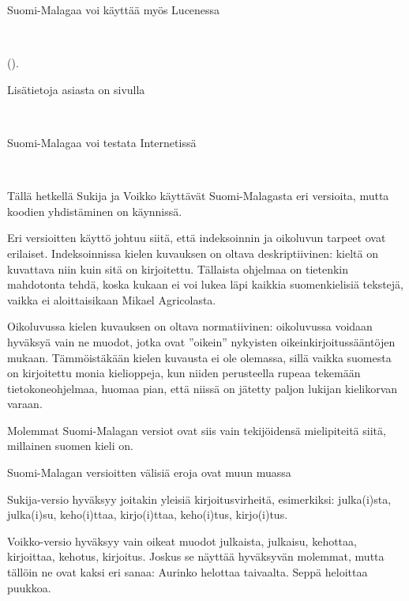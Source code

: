 \documentclass[12pt]{article}
\begin{document}
Suomi-Malagaa voi käyttää myös Lucenessa
\begin{latexonly} \\ \end{latexonly}
().

Lisätietoja asiasta on sivulla
\begin{latexonly} \\ \end{latexonly}

Suomi-Malagaa voi testata Internetissä
\begin{latexonly} \\ \end{latexonly}

\bigskip

Tällä hetkellä Sukija ja Voikko käyttävät Suomi-Malagasta eri
versioita, mutta koodien yhdistäminen on käynnissä.

Eri versioitten käyttö johtuu siitä, että indeksoinnin ja oikoluvun
tarpeet ovat erilaiset. Indeksoinnissa kielen kuvauksen on oltava
deskriptiivinen: kieltä on kuvattava niin kuin sitä on kirjoitettu.
Tällaista ohjelmaa on tietenkin mahdotonta tehdä, koska kukaan ei voi
lukea läpi kaikkia suomenkielisiä tekstejä, vaikka ei aloittaisikaan
Mikael Agricolasta.

Oikoluvussa kielen kuvauksen on oltava normatiivinen: oikoluvussa
voidaan hyväksyä vain ne muodot, jotka ovat ''oikein'' nykyisten
oikeinkirjoitussääntöjen mukaan. Tämmöistäkään kielen kuvausta ei ole
olemassa, sillä vaikka suomesta on kirjoitettu monia kielioppeja, kun
niiden perusteella rupeaa tekemään tietokoneohjelmaa, huomaa pian,
että niissä on jätetty paljon lukijan kielikorvan varaan.

Molemmat Suomi-Malagan versiot ovat siis vain tekijöidensä
mielipiteitä siitä, millainen suomen kieli on.

\bigskip

Suomi-Malagan versioitten välisiä eroja ovat muun muassa

Sukija-versio hyväksyy joitakin yleisiä kirjoitusvirheitä,
esimerkiksi: julka(i)sta, julka(i)su, keho(i)ttaa, kirjo(i)ttaa,
keho(i)tus, kirjo(i)tus.

Voikko-versio hyväksyy vain oikeat muodot julkaista, julkaisu,
kehottaa, kirjoittaa, kehotus, kirjoitus. Joskus se näyttää hyväksyvän
molemmat, mutta tällöin ne ovat kaksi eri sanaa: Aurinko helottaa
taivaalta. Seppä heloittaa puukkoa.
\end{document}
